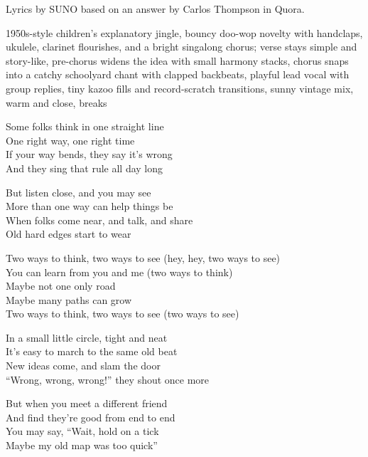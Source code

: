 
\begin{notes}
Lyrics by SUNO based on an answer by Carlos Thompson in Quora.
\end{notes}
\begin{style}
1950s-style children's explanatory jingle, bouncy doo-wop novelty with handclaps, ukulele, clarinet flourishes, and a bright singalong chorus; verse stays simple and story-like, pre-chorus widens the idea with small harmony stacks, chorus snaps into a catchy schoolyard chant with clapped backbeats, playful lead vocal with group replies, tiny kazoo fills and record-scratch transitions, sunny vintage mix, warm and close, breaks
\end{style}
\begin{lyrics}
Some folks think in one straight line\\
One right way, one right time\\
If your way bends, they say it's wrong\\
And they sing that rule all day long

But listen close, and you may see\\
More than one way can help things be\\
When folks come near, and talk, and share\\
Old hard edges start to wear

Two ways to think, two ways to see
(hey, hey, two ways to see)\\
You can learn from you and me
(two ways to think)\\
Maybe not one only road\\
Maybe many paths can grow\\
Two ways to think, two ways to see
(two ways to see)

In a small little circle, tight and neat\\
It’s easy to march to the same old beat\\
New ideas come, and slam the door\\
“Wrong, wrong, wrong!” they shout once more

But when you meet a different friend\\
And find they’re good from end to end\\
You may say, “Wait, hold on a tick\\
Maybe my old map was too quick”


\end{lyrics}
